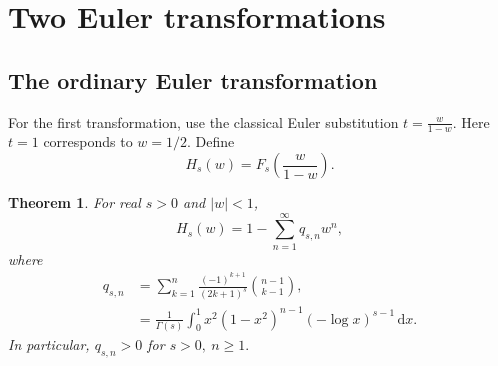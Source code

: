 \documentclass[11pt,reqno]{amsart}
\numberwithin{equation}{section}
\newtheorem{theorem}{Theorem}[section]
\theoremstyle{definition}
\theoremstyle{remark}
\newcommand{\dd}{\,\mathrm{d}}
\begin{document}
\section{Two Euler transformations}
\label{sec:transforms}

\subsection{The ordinary Euler transformation}

For the first transformation, use the classical Euler substitution
\(
 t=\frac{w}{1-w}.
\)
Here \(t=1\) corresponds to \(w=1/2\).  Define
\begin{equation}\label{eq:H-definition}
 H_s(w)=F_s\!\left(\frac{w}{1-w}\right).
\end{equation}
\begin{theorem}\label{thm:H-coefficients}
For real \(s>0\) and \(|w|<1\),
\begin{equation}\label{eq:H-expansion}
 H_s(w)=1-\sum_{n=1}^{\infty}q_{s,n}w^n,
\end{equation}
where
\begin{align}
 q_{s,n}
 &=
 \sum_{k=1}^{n}
 \frac{(-1)^{k+1}}{(2k+1)^s}
 \binom{n-1}{k-1},                       \label{eq:q-finite}\\
 &=
 \frac1{\Gamma(s)}
 \int_0^1
 x^2(1-x^2)^{n-1}
 (-\log x)^{s-1}\dd x.                 \label{eq:q-integral}
\end{align}
In particular,
\(
 q_{s,n}>0
 \) for \(s>0,\ n\geq1.
\)
\end{theorem}
\end{document}
